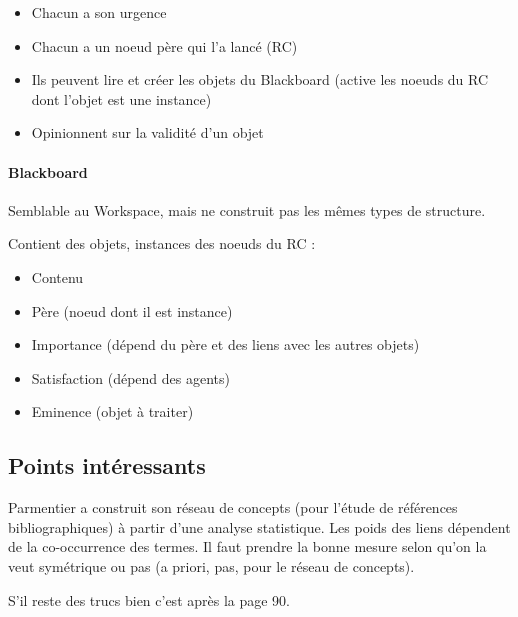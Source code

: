 \documentclass{article}           %
\begin{document}
\begin{itemize}
 \item Chacun a son urgence
 \item Chacun a un noeud père qui l'a lancé (RC)
 \item Ils peuvent lire et créer les objets du Blackboard (active les noeuds du RC dont l'objet est une instance)
 \item Opinionnent sur la validité d'un objet
\end{itemize}


\paragraph{Blackboard}
Semblable au Workspace, mais ne construit pas les mêmes types de structure.

Contient des objets, instances des noeuds du RC :
\begin{itemize}
 \item Contenu
 \item Père (noeud dont il est instance)
 \item Importance (dépend du père et des liens avec les autres objets)
 \item Satisfaction (dépend des agents)
 \item Eminence (objet à traiter)
\end{itemize}

\subsection{Points intéressants}
Parmentier a construit son réseau de concepts (pour l'étude de références bibliographiques) à  partir d'une analyse statistique. Les poids des liens dépendent de la co-occurrence des termes. Il faut prendre la bonne mesure selon qu'on la veut symétrique ou pas (a priori, pas, pour le réseau de concepts).

S'il reste des trucs bien c'est après la page 90.
\end{document}
